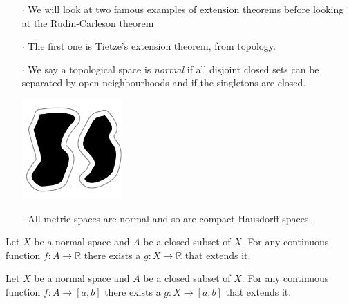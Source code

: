 \documentclass{beamer}
\begin{document}
\begin{frame}
\begin{enumerate}
\item[$\cdot$] We will look at two famous examples of extension theorems before looking at the Rudin-Carleson theorem
\item[$\cdot$] The first one is Tietze's extension theorem, from topology.
\item[$\cdot$] We say a topological space is \emph{normal} if all disjoint closed sets can be separated by open neighbourhoods and if the singletons are closed. 
\begin{center}
\includegraphics[width=0.3\textwidth]{normal}
\end{center}
\item[$\cdot$] All metric spaces are normal and so are compact Hausdorff spaces.
\end{enumerate}
\end{frame}

\begin{frame}
\begin{theorem}[Tietze]
Let $X$ be a normal space and $A$ be a closed subset of $X$.
For any continuous function $f \colon A \rightarrow \mathbb{R}$ there exists a $g \colon X \rightarrow \mathbb{R}$ that extends it.
\end{theorem}
\begin{theorem}[Tietze]
Let $X$ be a normal space and $A$ be a closed subset of $X$.
For any continuous function $f \colon A \rightarrow [a, b]$ there exists a $g \colon X \rightarrow [a, b]$ that extends it.
\end{theorem}
\end{frame}

\end{document}

